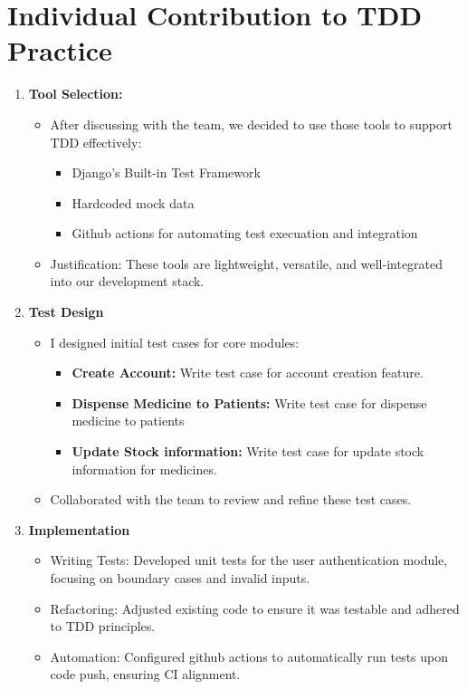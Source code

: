\documentclass[a4paper,12pt]{article}
\begin{document}
\section{Individual Contribution to TDD Practice}
\begin{enumerate}
    \item \textbf{Tool Selection:}
        \begin{itemize}
            \item After discussing with the team, we decided to use those tools to support TDD effectively:
                \begin{itemize}
                    \item Django's Built-in Test Framework  
                    \item Hardcoded mock data
                    \item Github actions for automating test execuation and integration
                \end{itemize}
            \item Justification: These tools are lightweight, versatile, and well-integrated into our
                development stack.
        \end{itemize}
    \item \textbf{Test Design}
        \begin{itemize}
            \item I designed initial test cases for core modules:
                \begin{itemize}
                    \item \textbf{Create Account: }Write test case for account creation feature.
                    \item \textbf{Dispense Medicine to Patients: }Write test case for dispense medicine to
                        patients
                    \item \textbf{Update Stock information: }Write test case for update stock information for
                        medicines.
                \end{itemize}
            \item Collaborated with the team to review and refine these test cases.
        \end{itemize}
    \item \textbf{Implementation}
        \begin{itemize}
            \item Writing Tests: Developed unit tests for the user authentication module, focusing on boundary
                cases and invalid inputs.
            \item Refactoring: Adjusted existing code to ensure it was testable and adhered to TDD principles.
            \item Automation: Configured github actions to automatically run tests upon code push, ensuring CI
                alignment.
        \end{itemize}
\end{enumerate}
\end{document}
